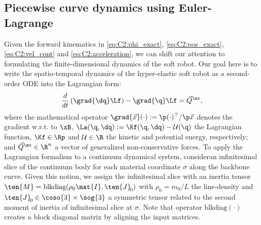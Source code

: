 \subsection{Piecewise curve dynamics using Euler-Lagrange}
\noindent Given the forward kinematics in \eqref{eq:C2:phi_exact}, \eqref{eq:C2:pos_exact}, \eqref{eq:C2:vel_cont} and \eqref{eq:C2:acceleration}, we can shift our attention to formulating the finite-dimensional dynamics of the soft robot. Our goal here is to write the spatio-temporal dynamics of the hyper-elastic soft robot as a second-order ODE into the Lagrangian form:
%
%
\begin{equation}
\frac{d}{d t}\left(\grad{\dq} \Lf \right) - \grad{\q} \Lf = \vec{Q}^{\nc}, \label{eq:C2:euler_largrange}
\end{equation}
%
\noindent where the mathematical operator $\grad{\vec{x}} (\cdot) := \p(\cdot)^\top/\p \vec{x}$ denotes the gradient w.r.t. to $\xB$, $\La(\q,\dq) := \Kf(\q,\dq) - \mathcal{U}(\q)$ the Lagrangian function, $\Kf \in \Rp$ and $\mathcal{U}\in \R$ the kinetic and potential energy, respectively; and $\vec{Q}^{\nc} \in \R^n$ a vector of generalized non-conservative forces. To apply the Lagrangian formalism to a continuum dynamical system, \editl consider\editr an infinitesimal slice of the continuum body for each material coordinate $\sigma$ along the backbone curve. Given this notion, we assign the infinitesimal slice with an inertia tensor $\ten{M} = \text{blkdiag}(\rho_0 \mat{I},\ten{J}_{\!0})$ with $\rho_0 = m_0/L$ the line-density and $\ten{J}_{\!0} \in \coso{3} \times \sog{3}$ a symmetric tensor related to the second moment of inertia of infinitesimal slice at $\sigma$. \editl Note that operator $\text{blkdiag}(\cdot)$ creates a block diagonal matrix by aligning the input matrices.\editr

